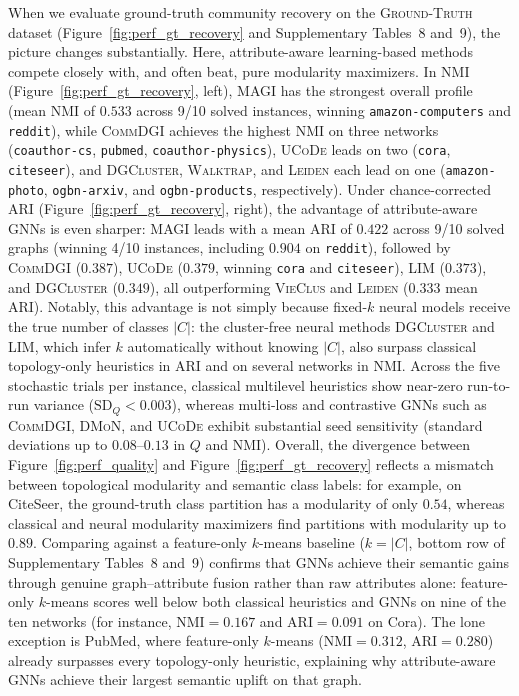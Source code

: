 \documentclass[11pt,a4paper]{article}
\begin{document}
When we evaluate ground-truth community recovery on the \textsc{Ground-Truth} dataset (Figure~\ref{fig:perf_gt_recovery} and Supplementary Tables~8 and~9), the picture changes substantially. Here, attribute-aware learning-based methods compete closely with, and often beat, pure modularity maximizers. In NMI (Figure~\ref{fig:perf_gt_recovery}, left), \textsc{MAGI} has the strongest overall profile (mean NMI of $0.533$ across 9/10 solved instances, winning \texttt{amazon-computers} and \texttt{reddit}), while \textsc{CommDGI} achieves the highest NMI on three networks (\texttt{coauthor-cs}, \texttt{pubmed}, \texttt{coauthor-physics}), \textsc{UCoDe} leads on two (\texttt{cora}, \texttt{citeseer}), and \textsc{DGCluster}, \textsc{Walktrap}, and \textsc{Leiden} each lead on one (\texttt{amazon-photo}, \texttt{ogbn-arxiv}, and \texttt{ogbn-products}, respectively). Under chance-corrected ARI (Figure~\ref{fig:perf_gt_recovery}, right), the advantage of attribute-aware GNNs is even sharper: \textsc{MAGI} leads with a mean ARI of $0.422$ across 9/10 solved graphs (winning 4/10 instances, including $0.904$ on \texttt{reddit}), followed by \textsc{CommDGI} ($0.387$), \textsc{UCoDe} ($0.379$, winning \texttt{cora} and \texttt{citeseer}), \textsc{LIM} ($0.373$), and \textsc{DGCluster} ($0.349$), all outperforming \textsc{VieClus} and \textsc{Leiden} ($0.333$ mean ARI). Notably, this advantage is not simply because fixed-$k$ neural models receive the true number of classes $|C|$: the cluster-free neural methods \textsc{DGCluster} and \textsc{LIM}, which infer $k$ automatically without knowing $|C|$, also surpass classical topology-only heuristics in ARI and on several networks in NMI. Across the five stochastic trials per instance, classical multilevel heuristics show near-zero run-to-run variance ($\text{SD}_Q < 0.003$), whereas multi-loss and contrastive GNNs such as \textsc{CommDGI}, \textsc{DMoN}, and \textsc{UCoDe} exhibit substantial seed sensitivity (standard deviations up to $0.08$--$0.13$ in $Q$ and NMI). Overall, the divergence between Figure~\ref{fig:perf_quality} and Figure~\ref{fig:perf_gt_recovery} reflects a mismatch between topological modularity and semantic class labels: for example, on CiteSeer, the ground-truth class partition has a modularity of only $0.54$, whereas classical and neural modularity maximizers find partitions with modularity up to $0.89$. Comparing against a feature-only $k$-means baseline ($k = |C|$, bottom row of Supplementary Tables~8 and~9) confirms that GNNs achieve their semantic gains through genuine graph--attribute fusion rather than raw attributes alone: feature-only $k$-means scores well below both classical heuristics and GNNs on nine of the ten networks (for instance, $\text{NMI} = 0.167$ and $\text{ARI} = 0.091$ on Cora). The lone exception is PubMed, where feature-only $k$-means ($\text{NMI} = 0.312$, $\text{ARI} = 0.280$) already surpasses every topology-only heuristic, explaining why attribute-aware GNNs achieve their largest semantic uplift on that graph.
\end{document}

